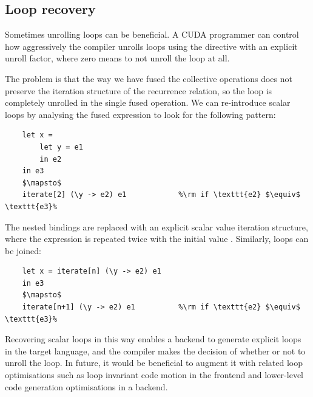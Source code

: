 

\subsection{Loop recovery}

Sometimes unrolling loops can be beneficial. A CUDA programmer can control how
aggressively the compiler unrolls loops using the 
directive with an explicit unroll factor, where zero means to not unroll the
loop at all.

The problem is that the way we have fused the collective operations does not
preserve the iteration structure of the recurrence relation, so the loop is
completely unrolled in the single fused operation. We can re-introduce scalar
loops by analysing the fused expression to look for the following pattern:
%
\begin{lstlisting}[style=Haskell,numbers=none,mathescape]
%\bf$\langle$ loop introduction $\rangle$%
    let x =
        let y = e1
        in e2
    in e3
    $\mapsto$
    iterate[2] (\y -> e2) e1            %\rm if \texttt{e2} $\equiv$ \texttt{e3}%
\end{lstlisting}
%
The nested bindings are replaced with an explicit scalar value iteration
structure, where the expression  is repeated twice with the initial
value . Similarly, loops can be joined:
%
\begin{lstlisting}[style=Haskell,numbers=none,mathescape]
%\bf$\langle$ loop joining $\rangle$%
    let x = iterate[n] (\y -> e2) e1
    in e3
    $\mapsto$
    iterate[n+1] (\y -> e2) e1          %\rm if \texttt{e2} $\equiv$ \texttt{e3}%
\end{lstlisting}
%
Recovering scalar loops in this way enables a backend to generate explicit loops
in the target language, and the compiler makes the decision of whether or not to
unroll the loop. In future, it would be beneficial to augment it with related
loop optimisations such as loop invariant code motion in the frontend and
lower-level code generation optimisations in a backend.


